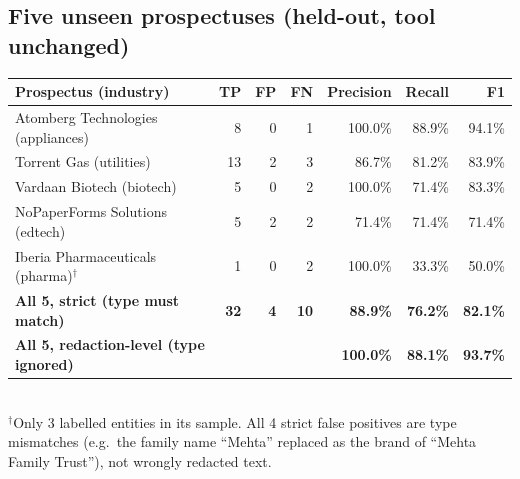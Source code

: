 \documentclass[11pt,a4paper]{article}
\begin{document}
\subsection{Five unseen prospectuses (held-out, tool unchanged)}
\begin{tabularx}{\textwidth}{@{}Lrrrrrr@{}}
\toprule
\textbf{Prospectus (industry)} & \textbf{TP} & \textbf{FP} & \textbf{FN} & \textbf{Precision} & \textbf{Recall} & \textbf{F1} \\
\midrule
Atomberg Technologies (appliances) & 8 & 0 & 1 & 100.0\% & 88.9\% & 94.1\% \\
Torrent Gas (utilities) & 13 & 2 & 3 & 86.7\% & 81.2\% & 83.9\% \\
Vardaan Biotech (biotech) & 5 & 0 & 2 & 100.0\% & 71.4\% & 83.3\% \\
NoPaperForms Solutions (edtech) & 5 & 2 & 2 & 71.4\% & 71.4\% & 71.4\% \\
Iberia Pharmaceuticals (pharma)$^{\dagger}$ & 1 & 0 & 2 & 100.0\% & 33.3\% & 50.0\% \\
\midrule
\textbf{All 5, strict (type must match)} & \textbf{32} & \textbf{4} & \textbf{10} & \textbf{88.9\%} & \textbf{76.2\%} & \textbf{82.1\%} \\
\textbf{All 5, redaction-level (type ignored)} & & & & \textbf{100.0\%} & \textbf{88.1\%} & \textbf{93.7\%} \\
\bottomrule
\end{tabularx}\\[2pt]
{\small $^{\dagger}$Only 3 labelled entities in its sample. All 4 strict false positives are type mismatches (e.g.\ the family name ``Mehta'' replaced as the brand of ``Mehta Family Trust''), not wrongly redacted text.}
\end{document}
